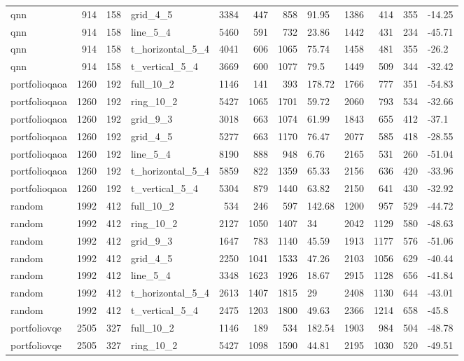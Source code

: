 \begin{longtable}{lrrlrrrlrrrl}
qnn & 914 & 158 & grid\_4\_5 & 3384 & 447 & 858 & 91.95 & 1386 & 414 & 355 & -14.25 \\
qnn & 914 & 158 & line\_5\_4 & 5460 & 591 & 732 & 23.86 & 1442 & 431 & 234 & -45.71 \\
qnn & 914 & 158 & t\_horizontal\_5\_4 & 4041 & 606 & 1065 & 75.74 & 1458 & 481 & 355 & -26.2 \\
qnn & 914 & 158 & t\_vertical\_5\_4 & 3669 & 600 & 1077 & 79.5 & 1449 & 509 & 344 & -32.42 \\
portfolioqaoa & 1260 & 192 & full\_10\_2 & 1146 & 141 & 393 & 178.72 & 1766 & 777 & 351 & -54.83 \\
portfolioqaoa & 1260 & 192 & ring\_10\_2 & 5427 & 1065 & 1701 & 59.72 & 2060 & 793 & 534 & -32.66 \\
portfolioqaoa & 1260 & 192 & grid\_9\_3 & 3018 & 663 & 1074 & 61.99 & 1843 & 655 & 412 & -37.1 \\
portfolioqaoa & 1260 & 192 & grid\_4\_5 & 5277 & 663 & 1170 & 76.47 & 2077 & 585 & 418 & -28.55 \\
portfolioqaoa & 1260 & 192 & line\_5\_4 & 8190 & 888 & 948 & 6.76 & 2165 & 531 & 260 & -51.04 \\
portfolioqaoa & 1260 & 192 & t\_horizontal\_5\_4 & 5859 & 822 & 1359 & 65.33 & 2156 & 636 & 420 & -33.96 \\
portfolioqaoa & 1260 & 192 & t\_vertical\_5\_4 & 5304 & 879 & 1440 & 63.82 & 2150 & 641 & 430 & -32.92 \\
random & 1992 & 412 & full\_10\_2 & 534 & 246 & 597 & 142.68 & 1200 & 957 & 529 & -44.72 \\
random & 1992 & 412 & ring\_10\_2 & 2127 & 1050 & 1407 & 34 & 2042 & 1129 & 580 & -48.63 \\
random & 1992 & 412 & grid\_9\_3 & 1647 & 783 & 1140 & 45.59 & 1913 & 1177 & 576 & -51.06 \\
random & 1992 & 412 & grid\_4\_5 & 2250 & 1041 & 1533 & 47.26 & 2103 & 1056 & 629 & -40.44 \\
random & 1992 & 412 & line\_5\_4 & 3348 & 1623 & 1926 & 18.67 & 2915 & 1128 & 656 & -41.84 \\
random & 1992 & 412 & t\_horizontal\_5\_4 & 2613 & 1407 & 1815 & 29 & 2408 & 1130 & 644 & -43.01 \\
random & 1992 & 412 & t\_vertical\_5\_4 & 2475 & 1203 & 1800 & 49.63 & 2366 & 1214 & 658 & -45.8 \\
portfoliovqe & 2505 & 327 & full\_10\_2 & 1146 & 189 & 534 & 182.54 & 1903 & 984 & 504 & -48.78 \\
portfoliovqe & 2505 & 327 & ring\_10\_2 & 5427 & 1098 & 1590 & 44.81 & 2195 & 1030 & 520 & -49.51 \\

\end{longtable}
